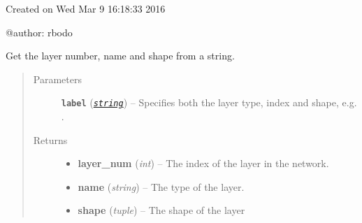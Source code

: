 \documentclass[letterpaper,10pt,english]{sphinxmanual}
\begin{document}
Created on Wed Mar  9 16:18:33 2016

@author: rbodo

\begin{fulllineitems}
\label{core:core.util.extract_label}
Get the layer number, name and shape from a string.
\begin{quote}\begin{description}
\item[{Parameters}] \leavevmode
\textbf{\texttt{label}} (\href{https://docs.python.org/library/string.html\#module-string}{\emph{\texttt{string}}}) -- Specifies both the layer type, index and shape, e.g.
.

\item[{Returns}] \leavevmode
\begin{itemize}
\item {} 
\textbf{layer\_num} (\emph{int}) -- The index of the layer in the network.

\item {} 
\textbf{name} (\emph{string}) -- The type of the layer.

\item {} 
\textbf{shape} (\emph{tuple}) -- The shape of the layer

\end{itemize}


\end{description}\end{quote}

\end{fulllineitems}


\begin{fulllineitems}
\label{core:core.util.get_activ_fn_for_layer}
\end{fulllineitems}

\end{document}
